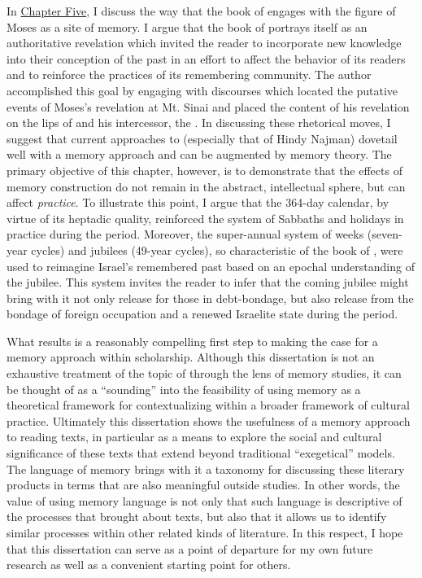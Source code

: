 In \hyperref[chap:jubilees]{Chapter Five}, I discuss the way that the book of \jub engages with the figure of Moses as a site of memory. I argue that the book of \jub portrays itself as an authoritative revelation which invited the reader to incorporate new knowledge into their conception of the past in an effort to affect the behavior of its readers and to reinforce the practices of its remembering community. The author accomplished this goal by engaging with \Psgraphical discourses which located the putative events of Moses's revelation at Mt. Sinai and placed the content of his revelation on the lips of \yahweh and his intercessor, the \ap. In discussing these rhetorical moves, I suggest that current approaches to \jub (especially that of Hindy Najman) dovetail well with a memory approach and can be augmented by memory theory. The primary objective of this chapter, however, is to demonstrate that the effects of memory construction do not remain in the abstract, intellectual sphere, but can affect \emph{practice}. To illustrate this point, I argue that the 364-day calendar, by virtue of its heptadic quality, reinforced the system of Sabbaths and holidays in practice during the \secondtemple period. Moreover, the super-annual system of weeks (seven-year cycles) and jubilees (49-year cycles), so characteristic of the book of \jub, were used to reimagine Israel's remembered past based on an epochal understanding of the jubilee. This system invites the reader to infer that the coming jubilee might bring with it not only release for those in debt-bondage, but also release from the bondage of foreign occupation and a renewed Israelite state during the \secondtemple period.

What results is a reasonably compelling first step to making the case for a memory approach within \rwb scholarship. Although this dissertation is not an exhaustive treatment of the topic of \rwb through the lens of memory studies, it can be thought of as a ``sounding'' into the feasibility of using memory as a theoretical framework for contextualizing \rwb within a broader framework of cultural practice. Ultimately this dissertation shows the usefulness of a memory approach to reading \rwb texts, in particular as a means to explore the social and cultural significance of these texts that extend beyond traditional ``exegetical'' models. The language of memory  brings with it a taxonomy for discussing these literary products in terms that are also meaningful outside \secondtemple studies. In other words, the value of using memory language is not only that such language is descriptive of the processes that brought about \rwb texts, but also that it allows us to identify similar processes within other related kinds of literature. In this respect, I hope that this dissertation can serve as a point of departure for my own future research as well as a convenient starting point for others. 